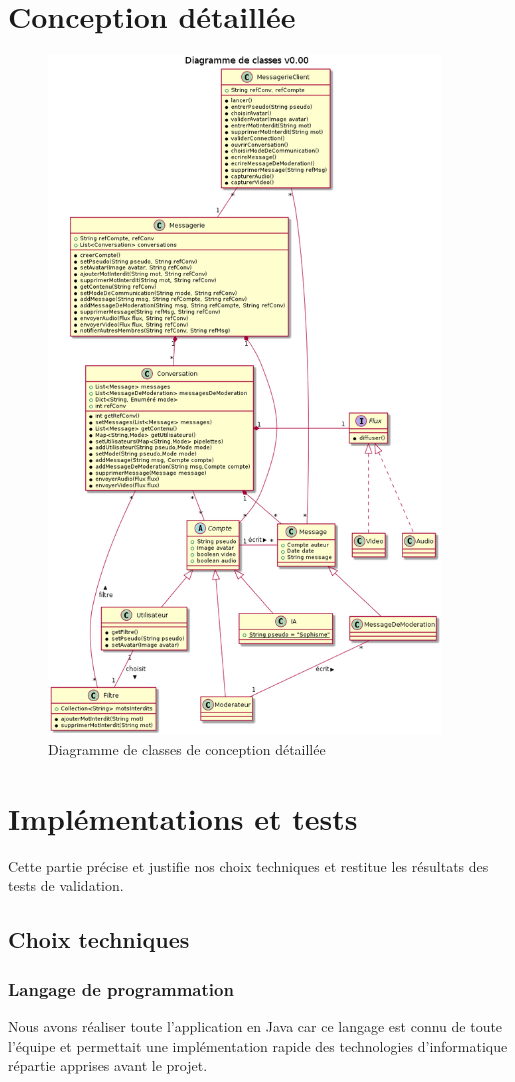 \documentclass[11pt,dvipsnames,svgnames]{report}
\begin{document}
\chapter{Conception détaillée}
\begin{figure}[H]
\caption{Diagramme de classes de conception détaillée}
\centerline{\includegraphics[height=18cm]{diagrammes/detailedConception.png}}
\end{figure}
\chapter{Implémentations et tests}
Cette partie précise et justifie nos choix techniques et restitue les résultats des tests de validation.
\section{Choix techniques}
\subsection{Langage de programmation}
Nous avons réaliser toute l'application en Java car ce langage est connu de toute l'équipe et permettait une implémentation rapide des technologies d'informatique répartie apprises avant le projet.
\end{document}
